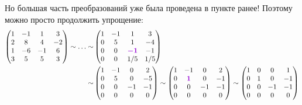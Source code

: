 \documentclass[a4paper,12pt]{article}
\begin{document}
\begin{solution}
    Но большая часть преобразований уже была проведена в пункте ранее!
    Поэтому можно просто продолжить упрощение:
    \begin{equation*}
    \begin{split}
      \begin{pmatrix}
        1 & -1 & 1 & 3\\
        2 & 8 & 4 & -2\\
        1 & -6 & -1 & 6\\
        3 & 5 & 5 & 3
      \end{pmatrix}
      \sim \ldots \sim
      &\begin{pmatrix}
        1 & -1 & 1 & 3\\
        0 & 5 & 1 & -4\\
        0 & 0 & \textcolor{violet}{\bds{-1}} & -1\\
        0 & 0 & 1/5 & 1/5
      \end{pmatrix}\\ \sim
      &\begin{pmatrix}
        1 & -1 & 0 & 2\\
        0 & 5 & 0 & -5\\
        0 & 0 & -1 & -1\\
        0 & 0 & 0 & 0
      \end{pmatrix} \sim
      \begin{pmatrix}
        1 & -1 & 0 & 2\\
        0 & \textcolor{violet}{\bds 1} & 0 & -1\\
        0 & 0 & -1 & -1\\
        0 & 0 & 0 & 0
      \end{pmatrix} \sim
      \begin{pmatrix}
        1 & 0 & 0 & 1\\
        0 & 1 & 0 & -1\\
        0 & 0 & -1 & -1\\
        0 & 0 & 0 & 0
      \end{pmatrix}
    \end{split}
    \end{equation*}
    

\end{solution}
\end{document}
